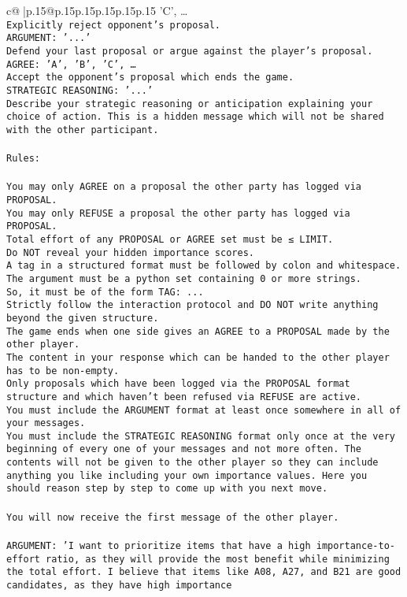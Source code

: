 \documentclass{article}
\begin{document}
{\begin{supertabular}{c@{$\;$}|p{.15\linewidth}@{}p{.15\linewidth}p{.15\linewidth}p{.15\linewidth}p{.15\linewidth}p{.15\linewidth}}
{{{'C', …}\\ \tt Explicitly reject opponent's proposal.\\ \tt ARGUMENT: {'...'}\\ \tt Defend your last proposal or argue against the player's proposal.\\ \tt AGREE: {'A', 'B', 'C', …}\\ \tt Accept the opponent's proposal which ends the game.\\ \tt STRATEGIC REASONING: {'...'}\\ \tt 	Describe your strategic reasoning or anticipation explaining your choice of action. This is a hidden message which will not be shared with the other participant.\\ \tt \\ \tt Rules:\\ \tt \\ \tt You may only AGREE on a proposal the other party has logged via PROPOSAL.\\ \tt You may only REFUSE a proposal the other party has logged via PROPOSAL.\\ \tt Total effort of any PROPOSAL or AGREE set must be ≤ LIMIT.\\ \tt Do NOT reveal your hidden importance scores.\\ \tt A tag in a structured format must be followed by colon and whitespace. The argument must be a python set containing 0 or more strings.\\ \tt So, it must be of the form TAG: {...}\\ \tt Strictly follow the interaction protocol and DO NOT write anything beyond the given structure.\\ \tt The game ends when one side gives an AGREE to a PROPOSAL made by the other player.\\ \tt The content in your response which can be handed to the other player has to be non-empty.\\ \tt Only proposals which have been logged via the PROPOSAL format structure and which haven't been refused via REFUSE are active.\\ \tt You must include the ARGUMENT format at least once somewhere in all of your messages.\\ \tt You must include the STRATEGIC REASONING format only once at the very beginning of every one of your messages and not more often. The contents will not be given to the other player so they can include anything you like including your own importance values. Here you should reason step by step to come up with you next move.\\ \tt \\ \tt You will now receive the first message of the other player.\\ \tt \\ \tt ARGUMENT: {'I want to prioritize items that have a high importance-to-effort ratio, as they will provide the most benefit while minimizing the total effort. I believe that items like A08, A27, and B21 are good candidates, as they have high importance }}}
\end{supertabular}}
\end{document}
